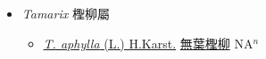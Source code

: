 
  \begin{itemize}
 \item[] \textit{Tamarix} 檉柳屬
                    
  \begin{itemize}
        \item[] \href{http://www.theplantlist.org/tpl1.1/search?q=Tamarix+aphylla}{\textit{T. aphylla} (L.) H.Karst.}   \href{\detokenize{http://taibnet.sinica.edu.tw/chi/taibnet_species_list.php?T2=無葉檉柳&T2_new_value=true&fr=y}}{無葉檉柳} NA$^n$
  \end{itemize}
  \end{itemize}
